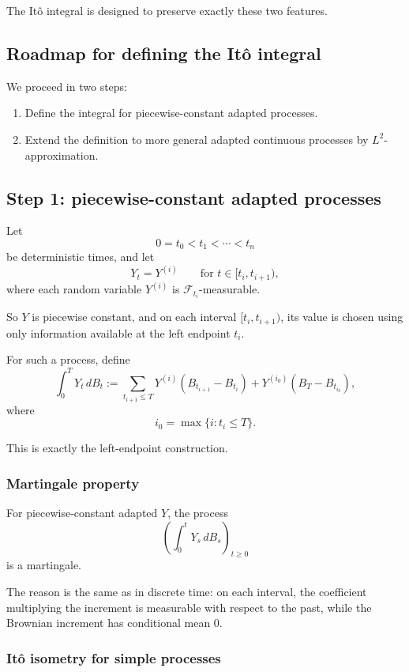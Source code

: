 \documentclass[11pt]{article}
\theoremstyle{definition}
\begin{document}
The It\^o integral is designed to preserve exactly these two features.

\subsection{Roadmap for defining the It\^o integral}

We proceed in two steps:
\begin{enumerate}[label=\arabic*.]
    \item Define the integral for piecewise-constant adapted processes.
    \item Extend the definition to more general adapted continuous processes by \(L^2\)-approximation.
\end{enumerate}

\subsection{Step 1: piecewise-constant adapted processes}

Let
\[
0=t_0<t_1<\cdots<t_n
\]
be deterministic times, and let
\[
Y_t=Y^{(i)}
\qquad \text{for } t\in [t_i,t_{i+1}),
\]
where each random variable \(Y^{(i)}\) is \(\mathcal F_{t_i}\)-measurable.

So \(Y\) is piecewise constant, and on each interval \([t_i,t_{i+1})\), its value is chosen using only information available at the left endpoint \(t_i\).

For such a process, define
\[
\int_0^T Y_t\,dB_t
:=
\sum_{t_{i+1}\le T} Y^{(i)}(B_{t_{i+1}}-B_{t_i})
+
Y^{(i_0)}(B_T-B_{t_{i_0}}),
\]
where
\[
i_0=\max\{i:t_i\le T\}.
\]

This is exactly the left-endpoint construction.

\subsubsection{Martingale property}

For piecewise-constant adapted \(Y\), the process
\[
\left(\int_0^t Y_s\,dB_s\right)_{t\ge 0}
\]
is a martingale.

The reason is the same as in discrete time: on each interval, the coefficient multiplying the increment is measurable with respect to the past, while the Brownian increment has conditional mean \(0\).

\subsubsection{It\^o isometry for simple processes}
\end{document}
